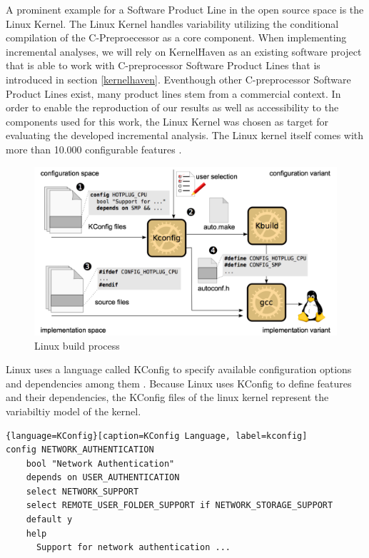 \documentclass[a4paper]{article}
\begin{document}
A prominent example for a Software Product Line in the open source space is the Linux Kernel. The Linux Kernel handles variability utilizing the conditional compilation of the C-Preproecessor as a core component. When implementing incremental analyses, we will rely on KernelHaven \cite{KroeherEl-SharkawySchmid18} as an existing software project that is able to work with C-preprocessor Software Product Lines that is introduced in section \ref{kernelhaven}. Eventhough other C-preprocessor Software Product Lines exist, many product lines stem from a commercial context. In order to enable the reproduction of our results as well as accessibility to the components used for this work, the Linux Kernel was chosen as target for evaluating the developed incremental analysis. The Linux kernel itself comes with more than 10.000 configurable features \cite{Tartler:2011:FCC:1966445.1966451}. 


\begin{figure}[h] 
  \centering
  \begin{minipage}[b]{1\textwidth} 
    \caption[Linux build process]{Linux build process \cite{Tartler:2011:FCC:1966445.1966451}}\label{linux-build}
    \includegraphics[width=1\textwidth]{img/linux-build.png}
  \end{minipage}
\end{figure}


Linux uses a language called KConfig to specify available configuration options and dependencies among them \cite{variabilitymodel-linux}. Because Linux uses KConfig to define features and their dependencies, the KConfig files of the linux kernel represent the variabiltiy model of the kernel.


\begin{lstlisting}{language=KConfig}[caption=KConfig Language, label=kconfig]
config NETWORK_AUTHENTICATION
	bool "Network Authentication"
	depends on USER_AUTHENTICATION
	select NETWORK_SUPPORT
	select REMOTE_USER_FOLDER_SUPPORT if NETWORK_STORAGE_SUPPORT
	default y
	help
	  Support for network authentication ...
\end{lstlisting}
 
\end{document}
